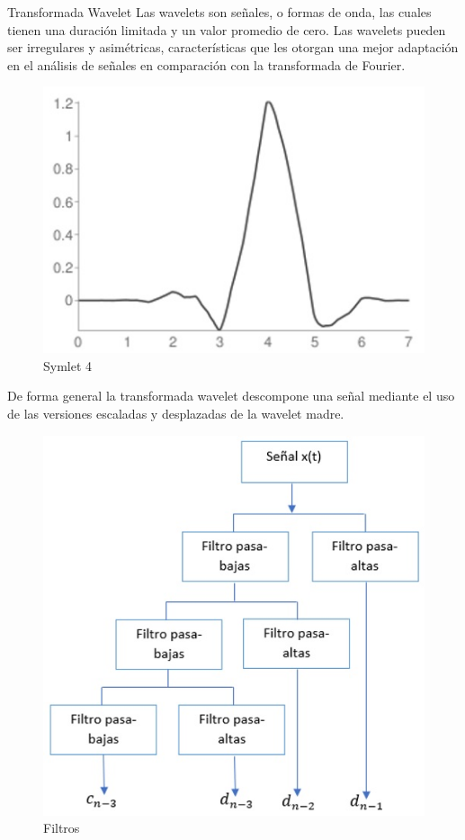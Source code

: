 \begin{frame}{Transformada Wavelet}
    Las wavelets son señales, o formas de onda, las cuales tienen una duración limitada y un valor promedio de cero. Las wavelets pueden ser irregulares y asimétricas, características que les otorgan una mejor adaptación en el análisis de señales en comparación con la transformada de Fourier.

    \begin{figure}
        \centering
        \includegraphics[scale=0.3]{img/section_07/Symlet-4.jpg}
        \caption{Symlet 4}
        \label{fig:symlet4}
    \end{figure}
\end{frame}

\begin{frame}
    De forma general la transformada wavelet descompone una señal mediante el uso de las versiones escaladas y desplazadas de la wavelet madre.

    \begin{figure}
        \centering
        \includegraphics[scale=0.3]{img/section_07/Filtros.jpg}
        \caption{Filtros}
        \label{fig:filtros}
    \end{figure}
\end{frame}

